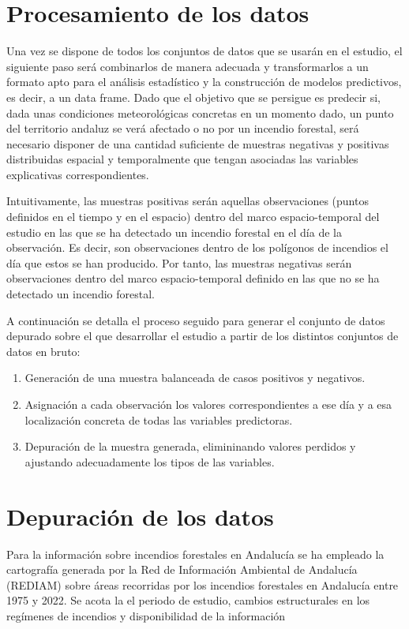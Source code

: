\documentclass[12pt,a4paper,]{book}
\numberwithin{dummy}{section}
\theoremstyle{ocrenumbox}
\theoremstyle{blacknumex}
\theoremstyle{blacknumbox}
\theoremstyle{ocrenum}
\theoremstyle{ocrenum}
\begin{document}
\hypertarget{procesamiento-de-los-datos}{%
\section{Procesamiento de los datos}\label{procesamiento-de-los-datos}}

Una vez se dispone de todos los conjuntos de datos que se usarán en el
estudio, el siguiente paso será combinarlos de manera adecuada y
transformarlos a un formato apto para el análisis estadístico y la
construcción de modelos predictivos, es decir, a un data frame. Dado que
el objetivo que se persigue es predecir si, dada unas condiciones
meteorológicas concretas en un momento dado, un punto del territorio
andaluz se verá afectado o no por un incendio forestal, será necesario
disponer de una cantidad suficiente de muestras negativas y positivas
distribuidas espacial y temporalmente que tengan asociadas las variables
explicativas correspondientes.

Intuitivamente, las muestras positivas serán aquellas observaciones
(puntos definidos en el tiempo y en el espacio) dentro del marco
espacio-temporal del estudio en las que se ha detectado un incendio
forestal en el día de la observación. Es decir, son observaciones dentro
de los polígonos de incendios el día que estos se han producido. Por
tanto, las muestras negativas serán observaciones dentro del marco
espacio-temporal definido en las que no se ha detectado un incendio
forestal.

A continuación se detalla el proceso seguido para generar el conjunto de
datos depurado sobre el que desarrollar el estudio a partir de los
distintos conjuntos de datos en bruto:

\begin{enumerate}
\def\labelenumi{\arabic{enumi}.}
\item
  Generación de una muestra balanceada de casos positivos y negativos.
\item
  Asignación a cada observación los valores correspondientes a ese día y
  a esa localización concreta de todas las variables predictoras.
\item
  Depuración de la muestra generada, elimininando valores perdidos y
  ajustando adecuadamente los tipos de las variables.
\end{enumerate}

\hypertarget{depuraciuxf3n-de-los-datos}{%
\section{Depuración de los datos}\label{depuraciuxf3n-de-los-datos}}

Para la información sobre incendios forestales en Andalucía se ha
empleado la cartografía generada por la Red de Información Ambiental de
Andalucía (REDIAM) sobre áreas recorridas por los incendios forestales
en Andalucía entre 1975 y 2022. Se acota la el periodo de estudio,
cambios estructurales en los regímenes de incendios y disponibilidad de
la información




%
\end{document}
